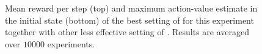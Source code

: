 \documentclass[conference]{IEEEtran}
\begin{document}
\begin{figure}[t]
\begin{minipage}{\columnwidth}
\end{minipage}
  \caption{Mean reward per step (top) and maximum action-value estimate in the initial state (bottom) of the best setting of \alg for this experiment together with other less effective setting of \alg. Results are averaged over $10000$ experiments.}
  \label{F:hasselt_QDecs}
\end{figure}
\begin{figure}[t]
\begin{minipage}{\columnwidth}
\centering

\end{minipage}
\end{figure}
\end{document}
